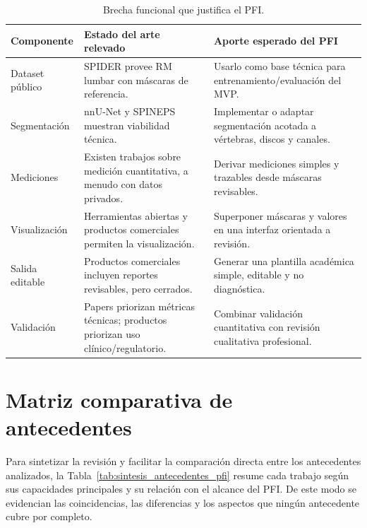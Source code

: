\begin{table}[htbp]
\centering
\caption{Brecha funcional que justifica el PFI.}
\label{tab:brecha_funcional_pfi}
\small
\begin{tabularx}{\textwidth}{p{} X X}
\hline
\textbf{Componente} & \textbf{Estado del arte relevado} & \textbf{Aporte esperado del PFI} \\
\hline
Dataset público & SPIDER provee RM lumbar con máscaras de referencia. & Usarlo como base técnica para entrenamiento/evaluación del MVP. \\
Segmentación & nnU-Net y SPINEPS muestran viabilidad técnica. & Implementar o adaptar segmentación acotada a vértebras, discos y canales. \\
Mediciones & Existen trabajos sobre medición cuantitativa, a menudo con datos privados. & Derivar mediciones simples y trazables desde máscaras revisables. \\
Visualización & Herramientas abiertas y productos comerciales permiten la visualización. & Superponer máscaras y valores en una interfaz orientada a revisión. \\
Salida editable & Productos comerciales incluyen reportes revisables, pero cerrados. & Generar una plantilla académica simple, editable y no diagnóstica. \\
Validación & Papers priorizan métricas técnicas; productos priorizan uso clínico/regulatorio. & Combinar validación cuantitativa con revisión cualitativa profesional. \\
\hline
\end{tabularx}
\end{table}

\section{Matriz comparativa de antecedentes}

Para sintetizar la revisión y facilitar la comparación directa entre los antecedentes analizados, la Tabla~\ref{tab:sintesis_antecedentes_pfi} resume cada trabajo según sus capacidades principales y su relación con el alcance del PFI. De este modo se evidencian las coincidencias, las diferencias y los aspectos que ningún antecedente cubre por completo.

